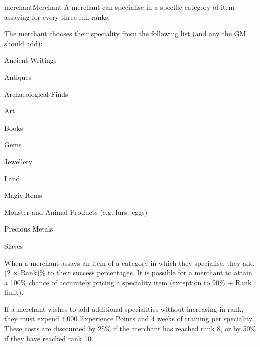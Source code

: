 \begin{Skill}[1.1]{merchant}{Merchant}
A merchant can specialise in a specific category of item assaying for
every three full ranks.

The merchant chooses their speciality from the following list (and any
the GM should add):

\begin{Enumerate}

\item Ancient Writings 
\item Antiques 
\item Archaeological Finds 
\item Art 
\item Books 
\item Gems 
\item Jewellery 
\item Land
\item Magic Items 
\item Monster and Animal Products (e.g. furs, eggs) 
\item Precious Metals 
\item Slaves 

\end{Enumerate}

When a merchant assays an item of a category in which they specialise,
they add (2 × Rank)\% to their success percentages.  It is possible
for a merchant to attain a 100\% chance of accurately pricing a
speciality item (exception to 90\% + Rank limit).

If a merchant wishes to add additional specialities without increasing
in rank, they must expend 4,000 Experience Points and 4 weeks of
training per speciality.  These costs are discounted by 25\% if the
merchant has reached rank 8, or by 50\% if they have reached rank 10.

\end{Skill}
